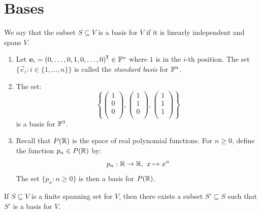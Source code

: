 \documentclass[../main.tex]{subfiles}
\begin{document}
\section{Bases}
\begin{definition}[Basis]
  We say that the subset $S \subseteq V$ is a basis for $V$ if it is linearly independent and spans $V$.
\end{definition}
\begin{example} \label{basesExamples}
  \begin{enumerate}
    \item Let $\mathbf{\bm{e}}_i = (0, \ldots, 0, 1, 0, \ldots, 0)^{{\mkern-1.5mu\mathsf{T}}} \in \mathbb{F}^{n}$ where $1$ is in the $i$-th position.
      The set $\{\vec{e}_i: i \in \{1, \ldots, n\}\}$ is called the \textit{standard basis} for $\mathbb{F}^{n}$.
    \item The set:
      \[
        \left\{\begin{pmatrix}
        1 \\
        0 \\
        0 \\
        \end{pmatrix}, \begin{pmatrix}
        1 \\
        1 \\
        0 \\
        \end{pmatrix}, \begin{pmatrix}
        1 \\
        1 \\
        1 \\
        \end{pmatrix}\right\}
      \]
      is a basis for $\mathbb{F}^3$.
    \item Recall that $P(\mathbb{R})$ is the space of real polynomial functions.
      For $n \geq 0$, define the function $p_n \in P(\mathbb{R})$ by:
      \[
        p_n: \mathbb{R} \to \mathbb{R},\ x \mapsto x^n
      \]
      The set $\{p_n: n \geq 0\}$ is then a basis for $P(\mathbb{R})$.
  \end{enumerate}
\end{example}
\begin{proposition}
  If $S \subseteq V$ is a finite spanning set for $V$, then there exists a subset $S' \subseteq S$ such that $S'$ is a basis for $V$. \label{finiteSpanningSub}
\end{proposition}
\end{document}
